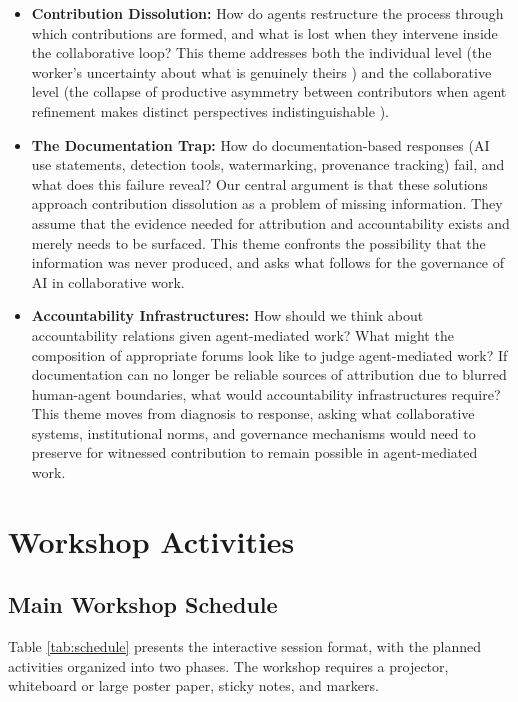\documentclass[manuscript,review]{acmart}
\begin{document}
\begin{itemize} \item \textbf{Contribution Dissolution:} How do agents restructure the process through which contributions are formed, and what is lost when they intervene inside the collaborative loop? This theme addresses both the individual level (the worker's uncertainty about what is genuinely theirs \cite{zindulka2025ai}) and the collaborative level (the collapse of productive asymmetry between contributors when agent refinement makes distinct perspectives indistinguishable \cite{fischer1999symmetry, imteyaz2026co}). 


\item \textbf{The Documentation Trap:} How do documentation-based responses (AI use statements, detection tools, watermarking, provenance tracking) fail, and what does this failure reveal? Our central argument is that these solutions approach contribution dissolution as a problem of missing information. They assume that the evidence needed for attribution and accountability exists and merely needs to be surfaced. This theme confronts the possibility that the information was never produced, and asks what follows for the governance of AI in collaborative work. 

\item \textbf{Accountability Infrastructures:} How should we think about accountability relations given agent-mediated work? What might the composition of appropriate forums look like to judge agent-mediated work? If documentation can no longer be reliable sources of attribution due to blurred human-agent boundaries, what would accountability infrastructures require? This theme moves from diagnosis to response, asking what collaborative systems, institutional norms, and governance mechanisms would need to preserve for witnessed contribution to remain possible in agent-mediated work.

\end{itemize}




\section{Workshop Activities}

\subsection{Main Workshop Schedule}
Table \ref{tab:schedule} presents the interactive session format, with the planned activities organized into two phases. The workshop requires a projector, whiteboard or large poster paper, sticky notes, and markers.
\end{document}
